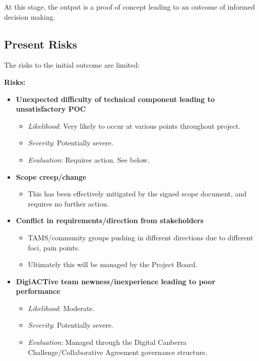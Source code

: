 \documentclass[12pt,a4paper,twosided]{article}
\begin{document}
At this stage, the output is a proof of concept leading to an outcome of
informed decision making.

\subsection{Present Risks}

The risks to the initial outcome are limited:

\textbf{Risks:}

\begin{itemize}
\itemsep1pt\parskip0pt
\item
  \textbf{Unexpected difficulty of technical component leading to
  unsatisfactory POC}

  \begin{itemize}
  \itemsep1pt\parskip0pt
  \item
    \emph{Likelihood}: Very likely to occur at various points throughout
    project.
  \item
    \emph{Severity}: Potentially severe.
  \item
    \emph{Evaluation}: Requires action. See below.
  \end{itemize}
\item
  \textbf{Scope creep/change}

  \begin{itemize}
  \itemsep1pt\parskip0pt
  \item
    This has been effectively mitigated by the signed scope document,
    and requires no further action.
  \end{itemize}
\item
  \textbf{Conflict in requirements/direction from stakeholders}

  \begin{itemize}
  \itemsep1pt\parskip0pt
  \item
    TAMS/community groups pushing in different directions due to
    different foci, pain points.
  \item
    Ultimately this will be managed by the Project Board.
  \end{itemize}
\item
  \textbf{DigiACTive team newness/inexperience leading to poor
  performance}

  \begin{itemize}
  \itemsep1pt\parskip0pt
  \item
    \emph{Likelihood}: Moderate.
  \item
    \emph{Severity}: Potentially severe.
  \item
    \emph{Evaluation}: Managed through the Digital Canberra
    Challenge/Collaborative Agreement governance structure.
  \end{itemize}
\end{itemize}
\end{document}
